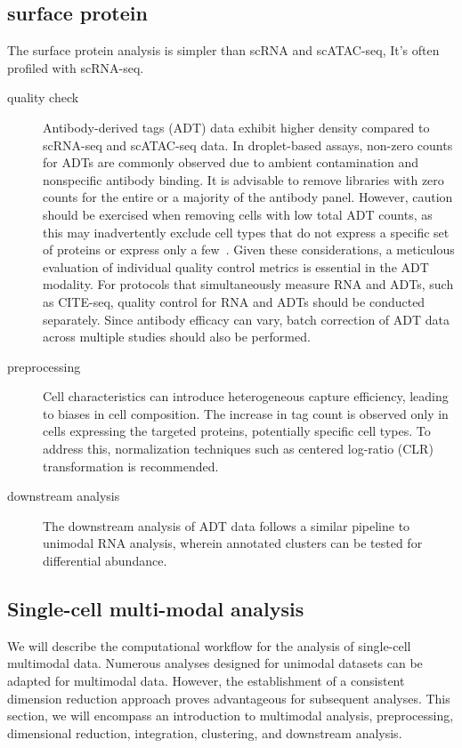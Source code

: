 \subsection{surface protein}
\label{background:sec2:protein}
The surface protein analysis is simpler than scRNA and scATAC-seq, It's often profiled with scRNA-seq.
\begin{description}
	\item[quality check] 
	Antibody-derived tags (ADT) data exhibit higher density compared to scRNA-seq and scATAC-seq data. In droplet-based assays, non-zero counts for ADTs are commonly observed due to ambient contamination and nonspecific antibody binding. It is advisable to remove libraries with zero counts for the entire or a majority of the antibody panel. However, caution should be exercised when removing cells with low total ADT counts, as this may inadvertently exclude cell types that do not express a specific set of proteins or express only a few~\citep{amezquita2020adtqc}. Given these considerations, a meticulous evaluation of individual quality control metrics is essential in the ADT modality. For protocols that simultaneously measure RNA and ADTs, such as CITE-seq, quality control for RNA and ADTs should be conducted separately. Since antibody efficacy can vary, batch correction of ADT data across multiple studies should also be performed\citep{zheng2022adtqc}.

	\item[preprocessing]
	Cell characteristics can introduce heterogeneous capture efficiency, leading to biases in cell composition. The increase in tag count is observed only in cells expressing the targeted proteins, potentially specific cell types\citep{zheng2022adtqc}. To address this, normalization techniques such as centered log-ratio (CLR) transformation is recommended\citep{stoeckius2017simultaneous}.


	\item[downstream analysis]
	The downstream analysis of ADT data follows a similar pipeline to unimodal RNA analysis, wherein annotated clusters can be tested for differential abundance.
\end{description}

\subsection{Single-cell multi-modal analysis}
\label{background:sec2:multimodal}
We will describe the computational workflow for the analysis of single-cell multimodal data. Numerous analyses designed for unimodal datasets can be adapted for multimodal data. However, the establishment of a consistent dimension reduction approach proves advantageous for subsequent analyses. This section, we will encompass an introduction to multimodal analysis,  preprocessing, dimensional reduction, integration, clustering, and downstream analysis.

